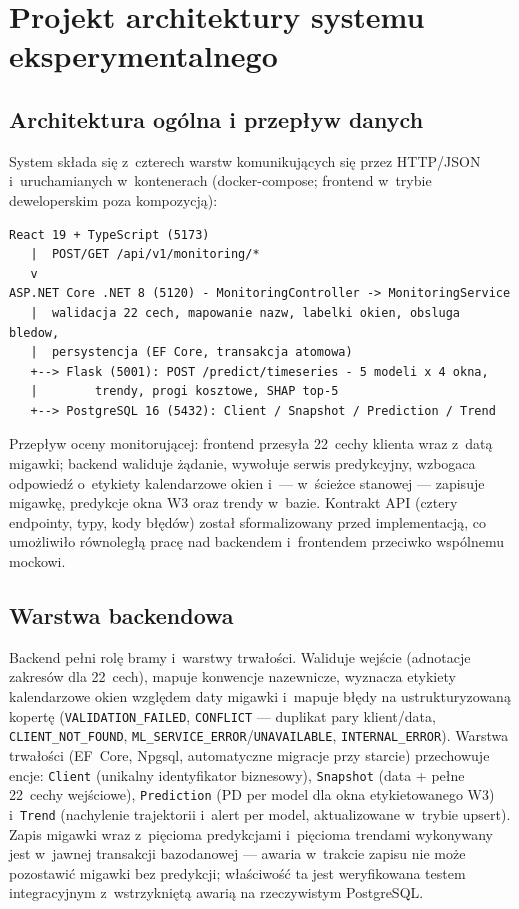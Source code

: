 \section{Projekt architektury systemu eksperymentalnego}

\subsection{Architektura ogólna i przepływ danych}

System składa się z~czterech warstw komunikujących się przez HTTP/JSON
i~uruchamianych w~kontenerach (docker-compose; frontend w~trybie deweloperskim
poza kompozycją):

\begin{verbatim}
React 19 + TypeScript (5173)
   |  POST/GET /api/v1/monitoring/*
   v
ASP.NET Core .NET 8 (5120) - MonitoringController -> MonitoringService
   |  walidacja 22 cech, mapowanie nazw, labelki okien, obsluga bledow,
   |  persystencja (EF Core, transakcja atomowa)
   +--> Flask (5001): POST /predict/timeseries - 5 modeli x 4 okna,
   |        trendy, progi kosztowe, SHAP top-5
   +--> PostgreSQL 16 (5432): Client / Snapshot / Prediction / Trend
\end{verbatim}

Przepływ oceny monitorującej: frontend przesyła 22~cechy klienta wraz z~datą
migawki; backend waliduje żądanie, wywołuje serwis predykcyjny, wzbogaca
odpowiedź o~etykiety kalendarzowe okien i~--- w~ścieżce stanowej --- zapisuje
migawkę, predykcje okna W3 oraz trendy w~bazie. Kontrakt API (cztery endpointy,
typy, kody błędów) został sformalizowany przed implementacją, co umożliwiło
równoległą pracę nad backendem i~frontendem przeciwko wspólnemu mockowi.

\subsection{Warstwa backendowa}

Backend pełni rolę bramy i~warstwy trwałości. Waliduje wejście (adnotacje
zakresów dla 22~cech), mapuje konwencje nazewnicze, wyznacza etykiety
kalendarzowe okien względem daty migawki i~mapuje błędy na ustrukturyzowaną
kopertę (\texttt{VALIDATION\_FAILED}, \texttt{CONFLICT} --- duplikat pary
klient/data, \texttt{CLIENT\_NOT\_FOUND},
\texttt{ML\_SERVICE\_ERROR}/\texttt{UNAVAILABLE}, \texttt{INTERNAL\_ERROR}).
Warstwa trwałości (EF~Core, Npgsql, automatyczne migracje przy starcie)
przechowuje encje: \texttt{Client} (unikalny identyfikator biznesowy),
\texttt{Snapshot} (data + pełne 22~cechy wejściowe), \texttt{Prediction}
(PD per model dla okna etykietowanego W3) i~\texttt{Trend} (nachylenie
trajektorii i~alert per model, aktualizowane w~trybie upsert). Zapis migawki
wraz z~pięcioma predykcjami i~pięcioma trendami wykonywany jest w~jawnej
transakcji bazodanowej --- awaria w~trakcie zapisu nie może pozostawić migawki
bez predykcji; właściwość ta jest weryfikowana testem integracyjnym
z~wstrzykniętą awarią na rzeczywistym PostgreSQL.

